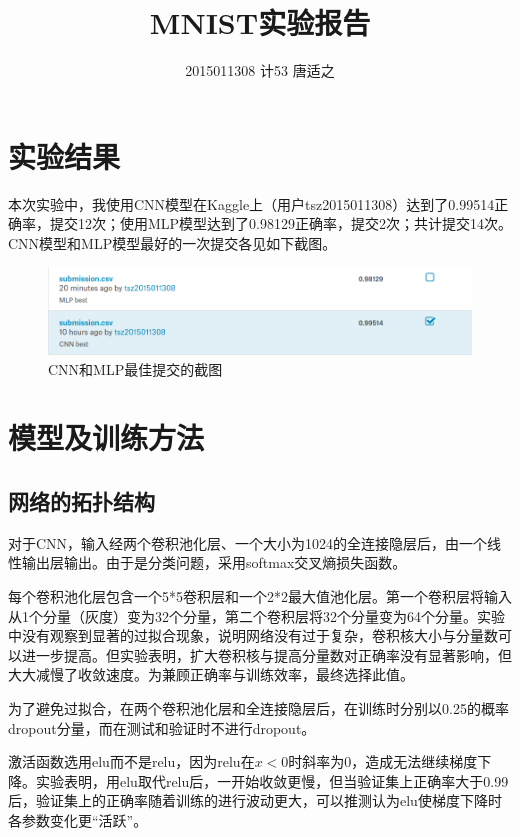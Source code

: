 \documentclass[UTF8]{ctexart}
\title{\huge MNIST实验报告}
\author{\large 2015011308 计53 唐适之}
\date{}
\begin{document}
    \maketitle

    \section{实验结果}

        本次实验中，我使用CNN模型在Kaggle上（用户tsz2015011308）达到了0.99514正确率，提交12次；使用MLP模型达到了0.98129正确率，提交2次；共计提交14次。CNN模型和MLP模型最好的一次提交各见如下截图。

    \begin{figure}[htp]
            \centering
            \includegraphics[width=\textwidth]{images/Screenshot.png}
            \caption{CNN和MLP最佳提交的截图}
        \end{figure}

    \section{模型及训练方法}

        \subsection{网络的拓扑结构}
            对于CNN，输入经两个卷积池化层、一个大小为1024的全连接隐层后，由一个线性输出层输出。由于是分类问题，采用softmax交叉熵损失函数。

            每个卷积池化层包含一个5*5卷积层和一个2*2最大值池化层。第一个卷积层将输入从1个分量（灰度）变为32个分量，第二个卷积层将32个分量变为64个分量。实验中没有观察到显著的过拟合现象，说明网络没有过于复杂，卷积核大小与分量数可以进一步提高。但实验表明，扩大卷积核与提高分量数对正确率没有显著影响，但大大减慢了收敛速度。为兼顾正确率与训练效率，最终选择此值。

            为了避免过拟合，在两个卷积池化层和全连接隐层后，在训练时分别以0.25的概率dropout分量，而在测试和验证时不进行dropout。

            激活函数选用elu而不是relu，因为relu在$x<0$时斜率为0，造成无法继续梯度下降。实验表明，用elu取代relu后，一开始收敛更慢，但当验证集上正确率大于0.99后，验证集上的正确率随着训练的进行波动更大，可以推测认为elu使梯度下降时各参数变化更“活跃”。
\end{document}
